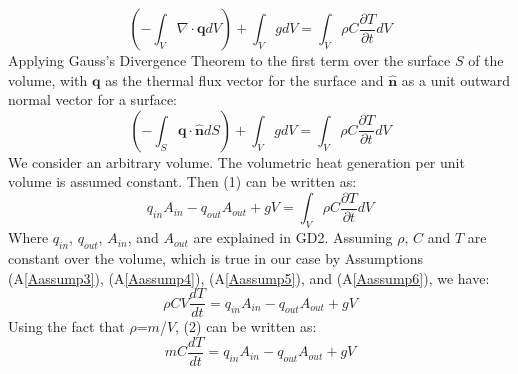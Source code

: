 \documentclass[12pt]{article}
\begin{document}
\begin{equation}
\left(-\int_{V}{\nabla{}\cdot{}\mathbf{q}dV}\right)+\int_{V}{gdV}=\int_{V}{\rho{}C\frac{\partial{}T}{\partial{}t}dV}
\end{equation}
Applying Gauss's Divergence Theorem to the first term over the surface $S$ of the volume, with $\mathbf{q}$ as the thermal flux vector for the surface and $\mathbf{\hat{n}}$ as a unit outward normal vector for a surface:
\begin{equation}
\left(-\int_{S}{\mathbf{q}\cdot{}\mathbf{\hat{n}}dS}\right)+\int_{V}{gdV}=\int_{V}{\rho{}C\frac{\partial{}T}{\partial{}t}dV}
\end{equation}
We consider an arbitrary volume. The volumetric heat generation per unit volume is assumed constant. Then (1) can be written as:
\begin{equation}
q_{in}A_{in}-q_{out}A_{out}+gV=\int_{V}{\rho{}C\frac{\partial{}T}{\partial{}t}dV}
\end{equation}
Where $q_{in}$, $q_{out}$, $A_{in}$, and $A_{out}$ are explained in GD2. Assuming $\rho{}$, $C$ and $T$ are constant over the volume, which is true in our case by Assumptions (A\ref{Aassump3}), (A\ref{Aassump4}), (A\ref{Aassump5}), and (A\ref{Aassump6}), we have:
\begin{equation}
\rho{}CV\frac{dT}{dt}=q_{in}A_{in}-q_{out}A_{out}+gV
\end{equation}
Using the fact that $\rho{}$=$m$/$V$, (2) can be written as:
\begin{equation}
mC\frac{dT}{dt}=q_{in}A_{in}-q_{out}A_{out}+gV
\end{equation}
\end{document}
